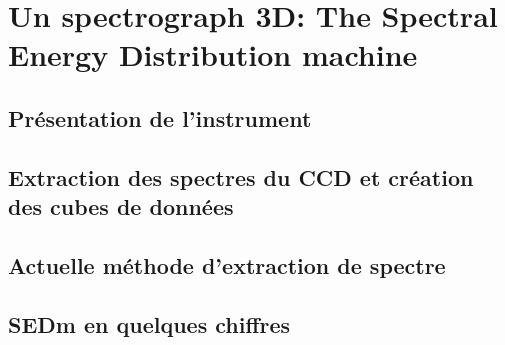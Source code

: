 \documentclass[../main/main.tex]{subfiles}
\begin{document}
\chapter{Un spectrograph 3D: The Spectral Energy Distribution machine}\label{ch:sedm}

\minitoc
\newpage

\section{Présentation de l'instrument}

\section{Extraction des spectres du CCD et création des cubes de données}

\section{Actuelle méthode d'extraction de spectre}

\section{SEDm en quelques chiffres}
\end{document}
